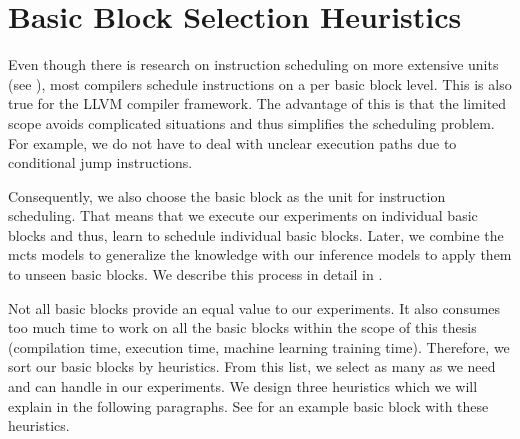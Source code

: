\section{Basic Block Selection Heuristics}
\label{sec:approach:basicblock}
Even though there is research on instruction scheduling on more extensive units (see ), most compilers schedule instructions on a per basic block level.
This is also true for the LLVM compiler framework.
The advantage of this is that the limited scope avoids complicated situations and thus simplifies the scheduling problem.
For example, we do not have to deal with unclear execution paths due to conditional jump instructions.

Consequently, we also choose the basic block as the unit for instruction scheduling.
That means that we execute our experiments on individual basic blocks and thus, learn to schedule individual basic blocks.
Later, we combine the \ac{mcts} models to generalize the knowledge with our inference models to apply them to unseen basic blocks.
We describe this process in detail in .

Not all basic blocks provide an equal value to our experiments.
It also consumes too much time to work on all the basic blocks within the scope of this thesis (\eg compilation time, execution time, machine learning training time).
Therefore, we sort our basic blocks by heuristics. 
From this list, we select as many as we need and can handle in our experiments.
We design three heuristics which we will explain in the following paragraphs.
See  for an example basic block with these heuristics.

